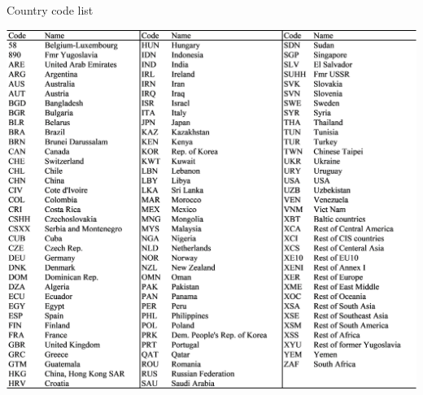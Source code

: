 \documentclass[10pt,a4paper,titlepage,dvipdfmx]{book}
\begin{document}
\begin{table}
\caption{\label{ref-0078} Country code list}\includegraphics[width=1\textwidth]{fig/image14.png}
\end{table}
 
\end{document}
